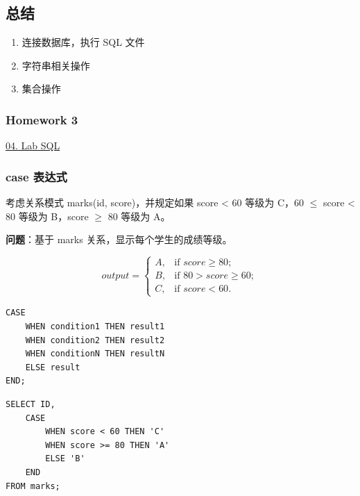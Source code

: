 \documentclass[aspectratio=169, 14pt]{beamer}
\begin{document}


\begin{frame}
	\section{\textcolor{darkmidnightblue}{总结}}
	\begin{enumerate}
		\item 连接数据库，执行 SQL 文件
		\item 字符串相关操作
		\item 集合操作
	\end{enumerate}

\end{frame}

\begin{frame}
	\frametitle{Homework 3}

	\href{https://github.com/ChenZhongPu/db-swufe/tree/master/04_lab_sql}{04. Lab SQL}

\end{frame}

\begin{frame}
	\frametitle{case 表达式}

	考虑关系模式 marks(id, score)，并规定如果 score < 60 等级为 C，60 $\leq$ score < 80 等级为 B，score $\geq$ 80 等级为 A。

	{\large {}} \textbf{问题}：基于 marks 关系，显示每个学生的成绩等级。

	\[
		output = \begin{cases}
			A, & \text{if $score \geq 80$};      \\
			B, & \text{if $80 > score \geq 60$}; \\
			C, & \text{if $score < 60$}.
		\end{cases}
	\]
\end{frame}
\begin{frame}[fragile]
	\begin{verbatim}
CASE
    WHEN condition1 THEN result1
    WHEN condition2 THEN result2
    WHEN conditionN THEN resultN
    ELSE result
END;
    \end{verbatim}

	\begin{verbatim}
SELECT ID,
    CASE
        WHEN score < 60 THEN 'C'
        WHEN score >= 80 THEN 'A'
        ELSE 'B'
    END
FROM marks;
    \end{verbatim}

\end{frame}
\end{document}

